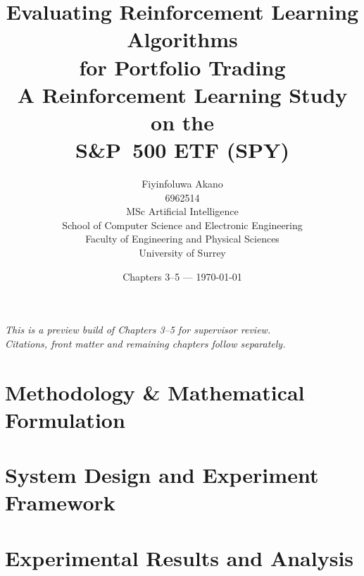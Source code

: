 \documentclass[11pt,a4paper,openany]{report}
\title{\Huge Evaluating Reinforcement Learning Algorithms\\
        for Portfolio Trading \\[0.6em]
        \Large A Reinforcement Learning Study on the\\
        S\&P~500 ETF (SPY)}
\author{Fiyinfoluwa Akano \\ \small 6962514 \\[0.5em]
        \small MSc Artificial Intelligence \\
        \small School of Computer Science and Electronic Engineering \\
        \small Faculty of Engineering and Physical Sciences \\
        \small University of Surrey}
\date{Chapters 3--5 --- \today}
\begin{document}
\maketitle

\begin{center}
\vspace*{1em}
\textit{This is a preview build of Chapters 3--5 for supervisor review.\\
Citations, front matter and remaining chapters follow separately.}
\end{center}

\tableofcontents
\clearpage

\chapter{Methodology \& Mathematical Formulation}


\chapter{System Design and Experiment Framework}


\chapter{Experimental Results and Analysis}


\renewcommand{\bibname}{References}


\end{document}
